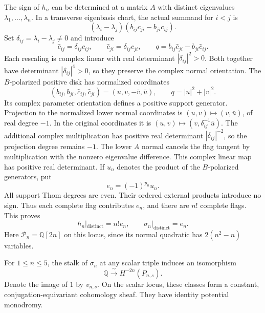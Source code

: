 The sign of $h_n$ can be determined at a matrix $A$ with distinct
eigenvalues $\lambda_1,\ldots,\lambda_n$. In a transverse eigenbasis
chart, the actual summand for $i<j$ is
\[
 (\lambda_i-\lambda_j)(b_{ij}c_{ji}-b_{ji}c_{ij}).
\]
Set $\delta_{ij}=\lambda_i-\lambda_j\ne0$ and introduce
\[
 \widehat c_{ij}=\delta_{ij}c_{ij},\qquad
 \widehat c_{ji}=\delta_{ij}c_{ji},\qquad
 q=b_{ij}\widehat c_{ji}-b_{ji}\widehat c_{ij}.
\]
Each rescaling is complex linear with real determinant
$|\delta_{ij}|^2>0$. Both together have determinant
$|\delta_{ij}|^4>0$, so they preserve the complex normal orientation.
The $B$-polarized positive disk has normalized coordinates
\[
 (b_{ij},b_{ji},\widehat c_{ij},\widehat c_{ji})=(u,v,-\bar v,\bar u),
 \qquad q=|u|^2+|v|^2.
\]
Its complex parameter orientation defines a positive support generator.
Projection to the normalized lower normal coordinates is
$(u,v)\mapsto(v,\bar u)$, of real degree $-1$. In the original
coordinates it is $(u,v)\mapsto(v,\delta_{ij}^{-1}\bar u)$.
The additional complex multiplication has positive real determinant
$|\delta_{ij}|^{-2}$, so the projection degree remains $-1$.
The lower $A$ normal cancels the flag tangent by multiplication with
the nonzero eigenvalue difference. This complex linear map has
positive real determinant.
If $u_n$ denotes the product of the $B$-polarized generators, put
\[
 e_n=(-1)^{p_n}u_n.
\]
All support Thom degrees are even. Their ordered external products
introduce no sign. Thus each complete flag contributes $e_n$, and
there are $n!$ complete flags. This proves
\begin{equation}
 h_n|_{\mathrm{distinct}}=n!e_n,
 \qquad \sigma_n|_{\mathrm{distinct}}=e_n.
 \label{sch:eq:regular}
\end{equation}
Here $\mathcal P_n=\mathbb Q[2n]$ on this locus, since its normal
quadratic has $2(n^2-n)$ variables.

\begin{theorem}
\label{sch:thm:generator}
For $1\leq n\leq5$, the stalk of $\sigma_n$ at any scalar triple
induces an isomorphism
\[
 \mathbb Q\xrightarrow{\ \sim\ }H^{-2n}(P_{n,s}).
\]
Denote the image of $1$ by $v_{n,s}$. On the scalar locus, these
classes form a constant, conjugation-equivariant cohomology sheaf.
They have identity potential monodromy.
\end{theorem}

